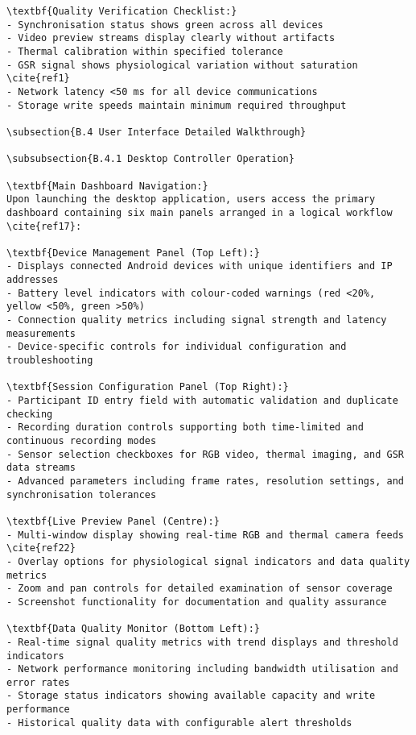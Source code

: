 \begin{verbatim}
\textbf{Quality Verification Checklist:}
- Synchronisation status shows green across all devices
- Video preview streams display clearly without artifacts
- Thermal calibration within specified tolerance
- GSR signal shows physiological variation without saturation \cite{ref1}
- Network latency <50 ms for all device communications
- Storage write speeds maintain minimum required throughput

\subsection{B.4 User Interface Detailed Walkthrough}

\subsubsection{B.4.1 Desktop Controller Operation}

\textbf{Main Dashboard Navigation:}
Upon launching the desktop application, users access the primary dashboard containing six main panels arranged in a logical workflow \cite{ref17}:

\textbf{Device Management Panel (Top Left):}
- Displays connected Android devices with unique identifiers and IP addresses
- Battery level indicators with colour-coded warnings (red <20%, yellow <50%, green >50%)
- Connection quality metrics including signal strength and latency measurements
- Device-specific controls for individual configuration and troubleshooting

\textbf{Session Configuration Panel (Top Right):}
- Participant ID entry field with automatic validation and duplicate checking
- Recording duration controls supporting both time-limited and continuous recording modes
- Sensor selection checkboxes for RGB video, thermal imaging, and GSR data streams
- Advanced parameters including frame rates, resolution settings, and synchronisation tolerances

\textbf{Live Preview Panel (Centre):}
- Multi-window display showing real-time RGB and thermal camera feeds \cite{ref22}
- Overlay options for physiological signal indicators and data quality metrics
- Zoom and pan controls for detailed examination of sensor coverage
- Screenshot functionality for documentation and quality assurance

\textbf{Data Quality Monitor (Bottom Left):}
- Real-time signal quality metrics with trend displays and threshold indicators
- Network performance monitoring including bandwidth utilisation and error rates
- Storage status indicators showing available capacity and write performance
- Historical quality data with configurable alert thresholds


\end{verbatim}
